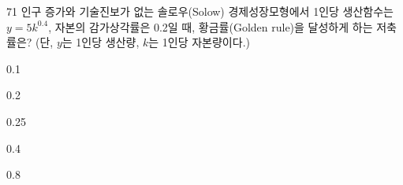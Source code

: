 \begin{question}{71}
인구 증가와 기술진보가 없는 솔로우(Solow) 경제성장모형에서 1인당 생산함수는 $y = 5k^{0.4}$, 자본의 감가상각률은 0.2일 때, 황금률(Golden rule)을 달성하게 하는 저축률은? (단, $y$는 1인당 생산량, $k$는 1인당 자본량이다.)
\begin{choices}
  \item 0.1
  \item 0.2
  \item 0.25
  \item 0.4
  \item 0.8
\end{choices}
\end{question}
